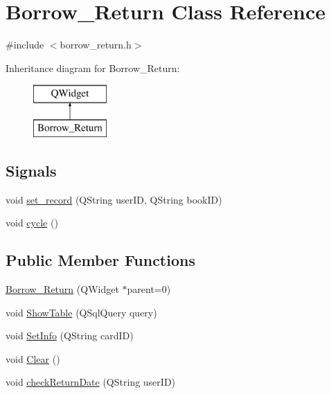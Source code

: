 \hypertarget{class_borrow___return}{}\section{Borrow\+\_\+\+Return Class Reference}
\label{class_borrow___return}


{\ttfamily \#include $<$borrow\+\_\+return.\+h$>$}

Inheritance diagram for Borrow\+\_\+\+Return\+:\begin{figure}[H]
\begin{center}
\leavevmode
\includegraphics[height=2.000000cm]{class_borrow___return}
\end{center}
\end{figure}
\subsection*{Signals}
\begin{DoxyCompactItemize}
\item 
void \mbox{\hyperlink{class_borrow___return_a8e6d3fb8c8fcab43ff158d5a0a1d7f40}{set\+\_\+record}} (Q\+String user\+ID, Q\+String book\+ID)
\item 
void \mbox{\hyperlink{class_borrow___return_a52dd74c4080e36657cf122c7c8569a89}{cycle}} ()
\end{DoxyCompactItemize}
\subsection*{Public Member Functions}
\begin{DoxyCompactItemize}
\item 
\mbox{\hyperlink{class_borrow___return_a60ee7fbb6b774305fbd655bd362572c5}{Borrow\+\_\+\+Return}} (Q\+Widget $\ast$parent=0)
\item 
void \mbox{\hyperlink{class_borrow___return_a061bb2484dacfe92218acb7d6e9494e5}{Show\+Table}} (Q\+Sql\+Query query)
\item 
void \mbox{\hyperlink{class_borrow___return_afd3bfd00077c0704c8b26f8e4254e176}{Set\+Info}} (Q\+String card\+ID)
\item 
void \mbox{\hyperlink{class_borrow___return_a65b8b7b7c224f0747c4330fb9aa6fdce}{Clear}} ()
\item 
void \mbox{\hyperlink{class_borrow___return_a1a2d49b2df8463373e60506f77005e64}{check\+Return\+Date}} (Q\+String user\+ID)
\end{DoxyCompactItemize}
